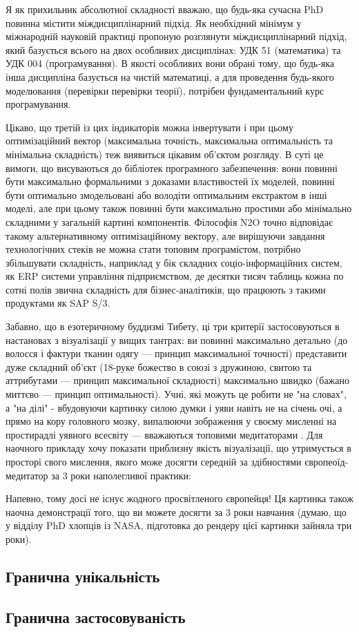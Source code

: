 Я як прихильник абсолютної складності вважаю, що будь-яка
сучасна PhD повинна містити міждисциплінарний підхід. Як
необхідний мінімум у міжнародній науковій практиці пропоную
розглянути міждисциплінарний підхід, який базується всього
на двох особливих дисциплінах: УДК 51 (математика) та
УДК 004 (програмування). В якості особливих вони обрані
тому, що будь-яка інша дисципліна базується на чистій
математиці, а для проведення будь-якого моделювання
(перевірки перевірки теорії), потрібен фундаментальний курс програмування.

Цікаво, що третій із цих індикаторів можна інвертувати
і при цьому оптимізаційний вектор (максимальна точність,
максимальна оптимальність та мінімальна складність) теж
виявиться цікавим об'єктом розгляду. В суті це вимоги,
 що висуваються до бібліотек програмного забезпечення:
вони повинні бути максимально формальними з доказами
властивостей їх моделей, повинні бути оптимально
змодельовані або володіти оптимальним екстрактом
в інші моделі, але при цьому також повинні бути
максимально простими або мінімально складними у
загальній картині компонентів. Філософія N2O точно
відповідає такому альтернативному оптимізаційному
вектору, але вирішуючи завдання технологічних стеків
не можна стати топовим програмістом, потрібно
збільшувати складність, наприклад у бік складних
соціо-інформаційних систем, як ERP системи управління
підприємством, де десятки тисяч таблиць кожна по
сотні полів звична складність для бізнес-аналітиків,
що працюють з такими продуктами як SAP S/3.

Забавно, що в езотеричному буддизмі Тибету,
ці три критерії застосовуються в настановах
з візуалізації у вищих тантрах: ви повинні
максимально детально (до волосся і фактури
тканин одягу --- принцип максимальної точності)
представити дуже складний об'єкт (18-руке божество
в союзі з дружиною, свитою та аттрибутами --- принцип
максимальної складності) максимально швидко (бажано
миттєво --- принцип оптимальності). Учні, які можуть
це робити не "на словах", а "на ділі" - вбудовуючи
картинку силою думки і уяви навіть не на січень очі,
а прямо на кору головного мозку, випалюючи зображення
у своєму мисленні на простирадлі уявного всесвіту ---
вважаються топовими медитаторами . Для наочного прикладу
хочу показати приблизну якість візуалізації, що
утримується в просторі свого мислення, якого може
досягти середній за здібностями європеоїд-медитатор
за 3 роки наполегливої практики:

Напевно, тому досі не існує жодного просвітленого
європейця! Ця картинка також наочна демонстрації
того, що ви можете досягти за 3 роки навчання (думаю,
що у відділу PhD хлопців із NASA, підготовка до рендеру
цієї картинки зайняла три роки).

\subsection{Гранична унікальність}

\subsection{Гранична застосовуваність}


\normalsize
